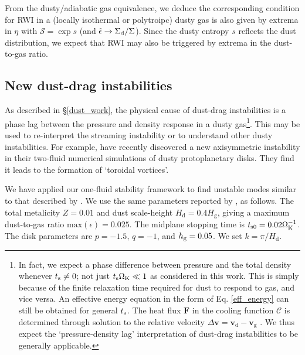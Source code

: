 From the dusty/adiabatic gas equivalence, we deduce the corresponding
condition for RWI in a (locally isothermal or polytroipc) dusty gas is
also given by extrema in $\eta$ with $\mathcal{S} = \exp{s}$ (and
$\tilde{\epsilon}\to \Sigma_\mathrm{d}/\Sigma$). Since
the dusty entropy $s$ reflects the dust distribution, we expect that
RWI may also be triggered by extrema in  the dust-to-gas ratio. 



\subsection{New dust-drag
  instabilities}\label{dust_as_thermo} 

As described in \S\ref{dust_work}, 
the physical cause of dust-drag instabilities is a phase lag between
the pressure and density response in a dusty gas\footnote{
In fact, we expect a phase difference between pressure and the total
density  whenever $t_\mathrm{s}\neq0$; not just $t_\mathrm{s}\Omega_{\rm K}\ll 1$ as 
considered in this work. This is simply because of the finite
relaxation time required for dust to respond to gas, and vice versa. 
An effective energy equation in the form of Eq. \ref{eff_energy} can
still be obtained for general $t_\mathrm{s}$. The
heat flux $\bm{F}$ in the cooling function $\mathcal{C}$ is determined
through solution to the relative velocity $\Delta \bm{v} =
\bm{v}_\mathrm{d}-\bm{v}_\mathrm{g}$ \citep{youdin05a,laibe14}.  We
thus expect the `pressure-density lag' interpretation of dust-drag 
instabilities to be generally applicable.}. 
This may be used to re-interpret the streaming instability or to
understand other dusty instabilities. For example,
\cite{loren15,loren16} have recently discovered a new axisymmetric 
instability in their two-fluid numerical simulations of dusty
protoplanetary disks. They find it leads to the formation of
`toroidal vortices'. 

We have applied our one-fluid stability framework to find unstable modes  
similar to that described by \cite{loren15}. We use the same
parameters reported by \citeauthor{loren15}, as follows. 
The total metalicity $Z=0.01$ and dust scale-height $H_\mathrm{d} =
0.4H_\mathrm{g}$, giving a maximum dust-to-gas ratio
$\mathrm{max}(\epsilon) = 0.025$. The midplane stopping time is 
$t_\mathrm{s0}=0.02\Omega_{\rm K}^{-1}$. The disk parameters are $p=-1.5,\, q=-1$, and  
$h_\mathrm{g}=0.05$. We set $k = \pi/H_\mathrm{d}$.      

